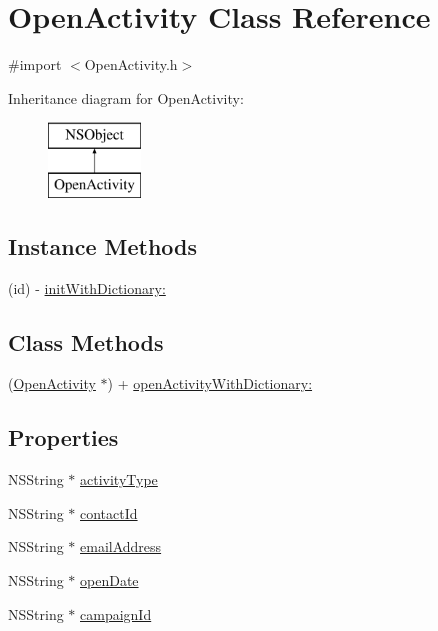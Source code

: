\hypertarget{interface_open_activity}{\section{Open\-Activity Class Reference}
\label{interface_open_activity}
}


{\ttfamily \#import $<$Open\-Activity.\-h$>$}

Inheritance diagram for Open\-Activity\-:\begin{figure}[H]
\begin{center}
\leavevmode
\includegraphics[height=2.000000cm]{interface_open_activity}
\end{center}
\end{figure}
\subsection*{Instance Methods}
\begin{DoxyCompactItemize}
\item 
(id) -\/ \hyperlink{interface_open_activity_ab862ab78c6c11c08afb00357d31f16a6}{init\-With\-Dictionary\-:}
\end{DoxyCompactItemize}
\subsection*{Class Methods}
\begin{DoxyCompactItemize}
\item 
(\hyperlink{interface_open_activity}{Open\-Activity} $\ast$) + \hyperlink{interface_open_activity_a04d10328efbeaff52a6f4aa76ea61284}{open\-Activity\-With\-Dictionary\-:}
\end{DoxyCompactItemize}
\subsection*{Properties}
\begin{DoxyCompactItemize}
\item 
N\-S\-String $\ast$ \hyperlink{interface_open_activity_a845ee590ad86c6da2fcd664768c0971f}{activity\-Type}
\item 
N\-S\-String $\ast$ \hyperlink{interface_open_activity_a49b69de4834004271ba25088c418e9b7}{contact\-Id}
\item 
N\-S\-String $\ast$ \hyperlink{interface_open_activity_a1c3077abd233822881504111b5226d9a}{email\-Address}
\item 
N\-S\-String $\ast$ \hyperlink{interface_open_activity_a9ae34102bd0a2cd1c285dea922ae1aba}{open\-Date}
\item 
N\-S\-String $\ast$ \hyperlink{interface_open_activity_a29b983f924c01e2486ea676c2a1c4a18}{campaign\-Id}
\end{DoxyCompactItemize}


